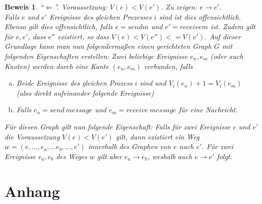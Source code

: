 \documentclass[a4paper,
12pt,
BCOR12mm,
]{scrartcl}
\theoremstyle{break}
\newtheorem{bew}{Beweis}
\begin{document}
\begin{bew}
  "`$\Leftarrow$"'. Voraussetzung: $V(e) < V(e')$. Zu zeigen: $e \rightarrow e'$. \\
  Falls $e$ und $e'$ Ereignisse des gleichen Prozesses $i$ sind ist dies offensichtlich.
  Ebenso gilt dies offensichtlich, falls $e = send m$ und $e' = receive m$ ist. Zudem gilt
  für $e,e'$, dass $e''$ existiert, so dass $V(e) < V(e'') <= V(e')$. Auf dieser
  Grundlage kann man nun folgendermaßen einen gerichteten Graph $G$ mit folgenden
  Eigenschaften erstellen: Zwei beliebige Ereignisse $e_n,e_m$ (oder auch Knoten) werden
  durch eine Kante $(e_n,e_m)$ verbunden, falls 
  \begin{enumerate}[(a)]
    \item Beide Ereignisse des gleichen Prozess $i$ sind und $V_i(e_n) + 1 = V_i(e_m)$
      (also direkt aufeinander folgende Ereignisse)
    \item Falls $e_n = send\ message$ und $e_m = receive\ message$ für eine Nachricht.
  \end{enumerate}
  Für diesen Graph gilt nun folgende Eigenschaft: Falls für zwei Ereignisse $e$ und $e'$
  die Voraussetzung $V(e) < V(e')$ gilt, dann existiert ein Weg $w = (e, \dots, e_a, \dots e_b, \dots, e')$ innerhalb des Graphen
  von $e$ nach $e'$. Für zwei Ereignisse $e_a, e_b$ des Weges $w$ gilt aber $e_a
  \rightarrow e_b$, weshalb auch $e \rightarrow e'$ folgt.

\end{bew}


\pagebreak
\section*{Anhang}
\label{Anhang}
\begin{appendix}
   
\end{appendix}
\end{document}
